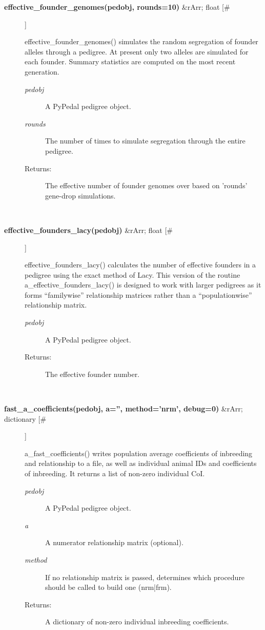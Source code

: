 \begin{description}
\item[\textbf{effective\_founder\_genomes(pedobj, rounds=10)}
 \&rArr; float [\#]]

 effective\_founder\_genomes() simulates the random segregation of founder alleles through a pedigree. At present only two alleles are simulated for each founder. Summary statistics are computed on the most recent generation.
\begin{description}
\item[\emph{pedobj}
] A PyPedal pedigree object.
\item[\emph{rounds}
] The number of times to simulate segregation through the entire pedigree.
\item[Returns:] The effective number of founder genomes over based on 'rounds' gene-drop simulations.

\end{description}
\\ 

\item[\textbf{effective\_founders\_lacy(pedobj)}
 \&rArr; float [\#]]

 effective\_founders\_lacy() calculates the number of effective founders in a pedigree using the exact method of Lacy. This version of the routine a\_effective\_founders\_lacy() is designed to work with larger pedigrees as it forms ``familywise'' relationship matrices rather than a ``populationwise'' relationship matrix.
\begin{description}
\item[\emph{pedobj}
] A PyPedal pedigree object.
\item[Returns:] The effective founder number.

\end{description}
\\ 

\item[\textbf{fast\_a\_coefficients(pedobj, a='', method='nrm', debug=0)}
 \&rArr; dictionary [\#]]

 a\_fast\_coefficients() writes population average coefficients of inbreeding and relationship to a file, as well as individual animal IDs and coefficients of inbreeding. It returns a list of non-zero individual CoI.
\begin{description}
\item[\emph{pedobj}
] A PyPedal pedigree object.
\item[\emph{a}
] A numerator relationship matrix (optional).
\item[\emph{method}
] If no relationship matrix is passed, determines which procedure should be called to build one (nrm|frm).
\item[Returns:] A dictionary of non-zero individual inbreeding coefficients.


\end{description}
\end{description}
